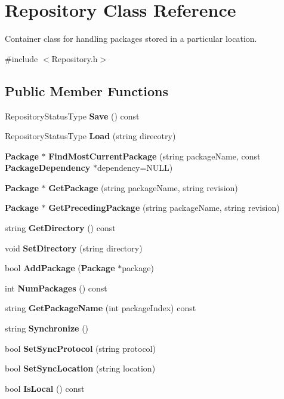 \section{Repository Class Reference}
\label{classRepository}


Container class for handling packages stored in a particular location.  




{\ttfamily \#include $<$Repository.h$>$}

\subsection*{Public Member Functions}
\begin{DoxyCompactItemize}
\item 
RepositoryStatusType {\bf Save} () const 
\item 
RepositoryStatusType {\bf Load} (string direcotry)
\item 
{\bf Package} $\ast$ {\bf FindMostCurrentPackage} (string packageName, const {\bf PackageDependency} $\ast$dependency=NULL)
\item 
{\bf Package} $\ast$ {\bf GetPackage} (string packageName, string revision)
\item 
{\bf Package} $\ast$ {\bf GetPrecedingPackage} (string packageName, string revision)
\item 
string {\bf GetDirectory} () const 
\item 
void {\bf SetDirectory} (string directory)
\item 
bool {\bf AddPackage} ({\bf Package} $\ast$package)
\item 
int {\bf NumPackages} () const 
\item 
string {\bf GetPackageName} (int packageIndex) const 
\item 
string {\bf Synchronize} ()
\item 
bool {\bf SetSyncProtocol} (string protocol)
\item 
bool {\bf SetSyncLocation} (string location)
\item 
bool {\bf IsLocal} () const 
\end{DoxyCompactItemize}
